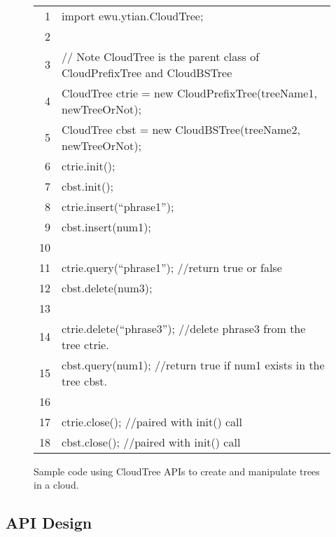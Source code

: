 \documentclass[10pt, conference, compsocconf]{IEEEtran}
\begin{document}
\begin{figure}
\begin{center}
{\tiny \tt 
\begin{tabular}{rl}
1 & import ewu.ytian.CloudTree;\\
2 & \\
3 & // Note CloudTree is the parent class of CloudPrefixTree and
CloudBSTree\\
4 & CloudTree ctrie = new CloudPrefixTree(treeName1, newTreeOrNot);\\5 & CloudTree cbst = new CloudBSTree(treeName2, newTreeOrNot);\\6 & ctrie.init();\\
7 & cbst.init();\\
8 & ctrie.insert(``phrase1'');\\
9 & cbst.insert(num1);\\
10 & \\
11 & ctrie.query(``phrase1''); //return true or false\\
12 & cbst.delete(num3);\\
13 & \\
14 & ctrie.delete(``phrase3''); //delete phrase3 from the tree ctrie.\\
15 & cbst.query(num1); //return true if num1 exists in the tree
cbst.\\
16 & \\
17 & ctrie.close(); //paired with init() call \\
18 & cbst.close(); //paired with init() call\\
\end{tabular}
}
\caption{Sample code using CloudTree APIs to create and manipulate trees in a cloud. }
\label{fig:usecase}
\end{center}
\end{figure}




\subsection{API Design}
\end{document}
